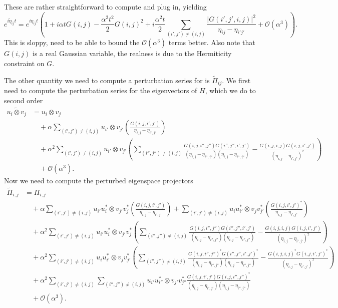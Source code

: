 \documentclass{article}
\newcommand{\parens}[1]{\left( #1 \right)}
\newcommand{\abs}[1]{\left| #1 \right|}
\newcommand{\bigo}[1]{\mathcal{O}\left( #1 \right)}
\begin{document}
These are rather straightforward to compute and plug in, yielding
\begin{equation}
    e^{i \widetilde{\eta}_{ij} t} = e^{i \eta_{ij} t}\parens{1 + i \alpha t G(i,j) - \frac{\alpha^2 t^2}{2} G(i,j)^2 + i \frac{\alpha^2 t}{2} \sum_{(i',j') \neq (i,j)}\frac{\abs{G(i',j',i,j)}^2}{\eta_{ij} - \eta_{i' j'}} + \bigo{\alpha^3}}.
\end{equation}
This is sloppy, need to be able to bound the $\bigo{\alpha^3}$ terms better. Also note that $G(i,j)$ is a real Gaussian variable, the realness is due to the Hermiticity constraint on $G$. 

The other quantity we need to compute a perturbation series for is $\widetilde{\Pi}_{ij}$. We first need to compute the perturbation series for the eigenvectors of $H$, which we do to second order
\begin{align}
    \widetilde{u_i \otimes v_j} &= u_i \otimes v_j \\
    &\quad + \alpha \sum_{(i',j') \neq (i,j)} u_{i'} \otimes v_{j'} \parens{  \frac{G(i,j,i',j')}{\eta_{i,j} - \eta_{i',j'}} } \\
    &\quad + \alpha^2 \sum_{(i',j') \neq (i,j)} u_{i'} \otimes v_{j'} \parens{ \sum_{(i'',j'') \neq (i,j)} \frac{G(i,j,i'',j'') G(i'',j'',i',j')}{(\eta_{i,j} - \eta_{i'',j''})(\eta_{i,j} - \eta_{i'',j''})} -  \frac{G(i,j,i,j) G(i,j,i',j')}{(\eta_{i,j} - \eta_{i',j'})^2}} \\
    &\quad + \bigo{\alpha^3}.
\end{align}
Now we need to compute the perturbed eigenspace projectors
\begin{align}
    \widetilde{\Pi}_{i,j} &= \Pi_{i,j} \\
    & \quad + \alpha \sum_{(i',j') \neq (i,j)} u_{i'} u_i^* \otimes v_{j'} v_j^* \parens{  \frac{G(i,j,i',j')}{\eta_{i,j} - \eta_{i',j'}} } + \sum_{(i',j') \neq (i,j)} u_i u_{i'}^* \otimes v_j v_{j'}^* \parens{  \frac{G(i,j,i',j')^*}{\eta_{i,j} - \eta_{i',j'}} } \\
    & \quad + \alpha^2 \sum_{(i',j') \neq (i,j)} u_{i'} u_i^* \otimes v_{j'} v_j^* \parens{ \sum_{(i'',j'') \neq (i,j)} \frac{G(i,j,i'',j'') G(i'',j'',i',j')}{(\eta_{i,j} - \eta_{i'',j''})(\eta_{i,j} - \eta_{i'',j''})} -  \frac{G(i,j,i,j) G(i,j,i',j')}{(\eta_{i,j} - \eta_{i',j'})^2}} \\
    & \quad + \alpha^2 \sum_{(i',j') \neq (i,j)} u_i u_{i'}^* \otimes v_j v_{j'}^* \parens{ \sum_{(i'',j'') \neq (i,j)} \frac{G(i,j,i'',j'')^* G(i'',j'',i',j')^*}{(\eta_{i,j} - \eta_{i'',j''})(\eta_{i,j} - \eta_{i'',j''})} -  \frac{G(i,j,i,j)^* G(i,j,i',j')^*}{(\eta_{i,j} - \eta_{i',j'})^2}} \\
    & \quad + \alpha^2 \sum_{(i',j') \neq (i,j)} \sum_{(i'',j'') \neq (i,j)} u_{i'}u_{i''}^* \otimes v_{j'} v_{j''}^* \frac{G(i,j,i',j') G(i,j,i'',j'')^*}{(\eta_{i,j} - \eta_{i',j'})(\eta_{i,j} - \eta_{i'',j''})} \\
    & \quad + \bigo{\alpha^3}.
\end{align}
\end{document}

